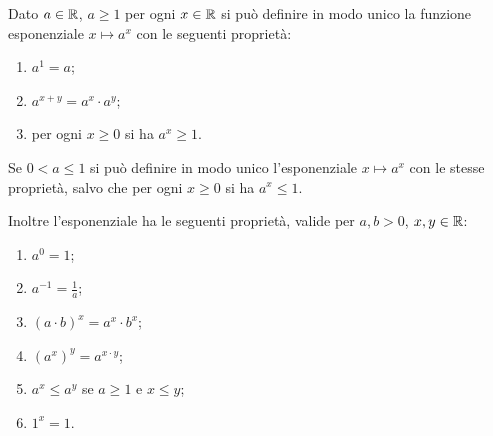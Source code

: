 \begin{theorem}
  \label{th:esponenziale}%
Dato $a\in {\mathbb R}$, $a\ge 1$ per ogni $x\in {\mathbb R}$ si può definire in modo unico 
la funzione esponenziale $x\mapsto a^x$ con le seguenti proprietà:
\begin{enumerate}
  \item $a^1=a$;
  \item $a^{x+y} = a^x \cdot a^y$;
  \item per ogni $x\ge 0$ si ha $a^x\ge 1$.
\end{enumerate}
Se $0<a \le 1$ si può definire in modo unico l'esponenziale $x\mapsto a^x$ 
con le stesse proprietà, salvo che per ogni $x\ge 0$ si ha $a^x\le 1$.

Inoltre l'esponenziale ha le seguenti proprietà, 
valide per $a,b>0$, $x,y\in {\mathbb R}$:
\begin{enumerate}
  \item $a^0=1$;
  \item $a^{-1} = \frac{1}{a}$;
  \item $(a\cdot b)^x = a^x\cdot b^x$;
  \item $(a^x)^y = a^{x\cdot y}$;
  \item $a^x \le a^y$ se $a\ge 1$ e $x\le y$;
  \item $1^x=1$.
\end{enumerate}
\end{theorem}
%
